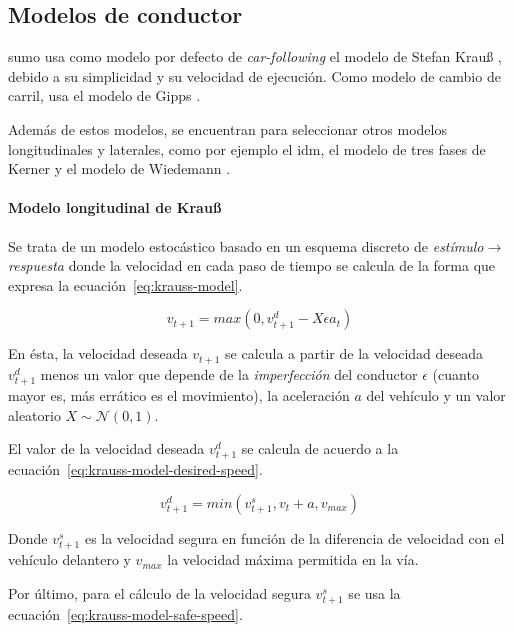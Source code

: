 \subsection{Modelos de conductor}

\gls{sumo} usa como modelo por defecto de \textit{\gls{car-following}} el modelo de Stefan Krauß \cite{krauss1998microscopic}, debido a su simplicidad y su velocidad de ejecución. Como modelo de cambio de carril, usa el modelo de Gipps \cite{Gipps1986}.

Además de estos modelos, se encuentran para seleccionar otros modelos longitudinales y laterales, como por ejemplo el \gls{idm}, el modelo de tres fases de Kerner \cite{kerner2008testbed} y el modelo de Wiedemann \cite{wiedemann1974simulation}.

\paragraph{Modelo longitudinal de Krauß}

Se trata de un modelo estocástico basado en un esquema discreto de \textit{estímulo}$\rightarrow$\textit{respuesta} donde la velocidad en cada paso de tiempo se calcula de la forma que expresa la ecuación~\ref{eq:krauss-model}.

\begin{equation}
	v_{t+1} = max(0, v_{t+1}^{d} - X \epsilon a_t)
	\label{eq:krauss-model}
\end{equation}

En ésta, la velocidad deseada $v_{t+1}$ se calcula a partir de la velocidad deseada $v_{t+1}^{d}$ menos un valor que depende de la \textit{imperfección} del conductor $\epsilon$ (cuanto mayor es, más errático es el movimiento), la aceleración $a$ del vehículo y un valor aleatorio $X \sim \mathcal{N}(0, 1)$.

El valor de la velocidad deseada $v_{t+1}^{d}$ se calcula de acuerdo a la ecuación~\ref{eq:krauss-model-desired-speed}.

\begin{equation}
	v_{t+1}^{d} = min(v_{t+1}^{s}, v_t + a, v_{max})
	\label{eq:krauss-model-desired-speed}
\end{equation}

Donde $v_{t+1}^{s}$ es la velocidad segura en función de la diferencia de velocidad con el vehículo delantero y $v_{max}$ la velocidad máxima permitida en la vía.

Por último, para el cálculo de la velocidad segura $v_{t+1}^{s}$ se usa la ecuación~\ref{eq:krauss-model-safe-speed}.


